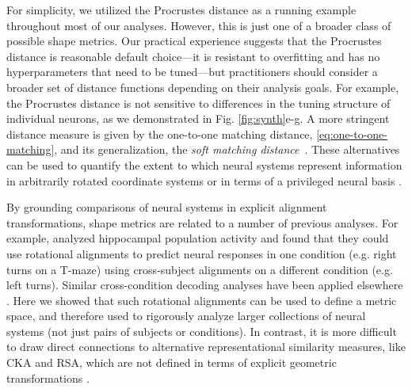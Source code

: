 For simplicity, we utilized the Procrustes distance as a running example throughout most of our analyses.
However, this is just one of a broader class of possible shape metrics.
Our practical experience suggests that the Procrustes distance is reasonable default choice---it is resistant to overfitting and has no hyperparameters that need to be tuned---but practitioners should consider a broader set of distance functions depending on their analysis goals.
For example, the Procrustes distance is not sensitive to differences in the tuning structure of individual neurons, as we demonstrated in Fig. \ref{fig:synth}e-g.
A more stringent distance measure is given by the one-to-one matching distance, \cref{eq:one-to-one-matching}, and its generalization, the \textit{soft matching distance}~\parencite{khosla2024soft}.
These alternatives can be used to quantify the extent to which neural systems represent information in arbitrarily rotated coordinate systems or in terms of a privileged neural basis %
\parencite{Khosla2024}.

By grounding comparisons of neural systems in explicit alignment transformations, shape metrics are related to a number of previous analyses.
For example, \textcite{Chen2021} analyzed hippocampal population activity and found that they could use rotational alignments to predict neural responses in one condition (e.g. right turns on a T-maze) using cross-subject alignments on a different condition (e.g. left turns).
Similar cross-condition decoding analyses have been applied elsewhere \parencite{saez, bernardi, barbosa2023}.
Here we showed that such rotational alignments can be used to define a metric space, and therefore used to rigorously analyze larger collections of neural systems (not just pairs of subjects or conditions).
In contrast, it is more difficult to draw direct connections to alternative representational similarity measures, like CKA and RSA, which are not defined in terms of explicit geometric transformations \parencite[but see][for a relation between Procrustes distance and RSA-style methods]{harvey2024duality}.

